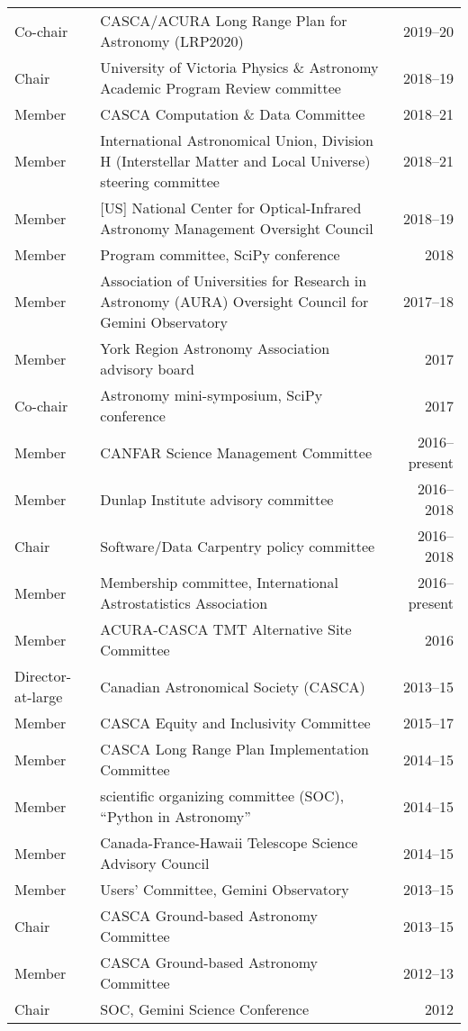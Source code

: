 \begin{tabularx}{\textwidth}{lXr}
Co-chair & CASCA/ACURA Long Range Plan for Astronomy (LRP2020) & 2019--20\\
Chair & University of Victoria Physics \& Astronomy Academic Program Review committee& 2018--19\\
Member & CASCA Computation \& Data Committee& 2018--21 \\
Member & International Astronomical Union, Division H (Interstellar Matter and Local Universe) steering committee& 2018--21 \\
Member& [US] National Center for Optical-Infrared Astronomy Management Oversight Council & 2018--19 \\
Member & Program committee, SciPy conference & 2018\\
Member & Association of Universities for Research in Astronomy (AURA) Oversight Council for Gemini Observatory & 2017--18\\
Member & York Region Astronomy Association advisory board & 2017\\
Co-chair & Astronomy mini-symposium, SciPy conference & 2017\\
Member & CANFAR Science Management Committee & 2016--present\\
Member & Dunlap Institute advisory committee & 2016--2018\\
Chair & Software/Data Carpentry policy committee & 2016--2018\\
Member & Membership committee, International Astrostatistics Association & 2016--present\\
Member & ACURA-CASCA TMT Alternative Site Committee & 2016\\
Director-at-large& Canadian Astronomical Society (CASCA)& 2013--15\\
Member& CASCA Equity and Inclusivity Committee& 2015--17\\
Member& CASCA Long Range Plan Implementation Committee& 2014--15\\
Member& scientific organizing committee (SOC), ``Python in Astronomy'' & 2014--15\\
Member& Canada-France-Hawaii Telescope Science Advisory Council& 2014--15\\
Member&  Users' Committee, Gemini Observatory& 2013--15\\
Chair& CASCA Ground-based Astronomy Committee& 2013--15\\
Member& CASCA Ground-based Astronomy Committee& 2012--13\\
Chair& SOC, Gemini Science Conference& 2012\\

\end{tabularx}

